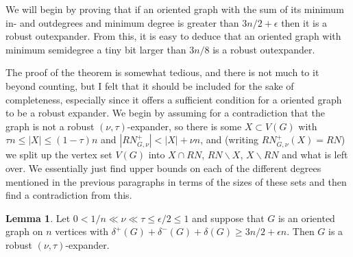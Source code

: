 \documentclass[10pt,letterpaper, reqno]{amsart}
\theoremstyle{definition}
\newtheorem{lemma}[thm]{Lemma}
\numberwithin{equation}{section}
\begin{document}
We will begin by proving that if an oriented graph with the sum of its minimum in- and outdegrees and minimum degree is greater than $3n/2 + \epsilon$ then it is a robust outexpander. From this, it is easy to deduce that an oriented graph with minimum semidegree a tiny bit larger than $3n/8$ is a robust outexpander. 

The proof of the theorem is somewhat tedious, and there is not much to it beyond counting, but I felt that it should be included for the sake of completeness, especially since it offers a sufficient condition for a oriented graph to be a robust expander. We begin by assuming for a contradiction that the graph is not a robust $(\nu,\tau)$-expander, so there is some $X \subset V(G)$ with $\tau n \leq |X| \leq (1-\tau)n$ and $|RN^+_{G,\nu}| < |X| + \nu n$, and (writing $RN^+_{G,\nu}(X)=RN$) we split up the vertex set $V(G)$ into $X \cap RN$, $RN\backslash X$, $X\backslash RN$ and what is left over. We essentially just find upper bounds on each of the different degrees mentioned in the previous paragraphs in terms of the sizes of these sets and then find a contradiction from this.

\begin{lemma}\label{13.1}
	Let $0 < 1/n \ll \nu \ll \tau \leq \epsilon/2 \leq 1$ and suppose that $G$ is an oriented graph on $n$ vertices with $\delta^+(G) + \delta^-(G) + \delta(G) \geq 3n/2 + \epsilon n$. Then $G$ is a robust $(\nu,\tau)$-expander.
\end{lemma}
\end{document}
